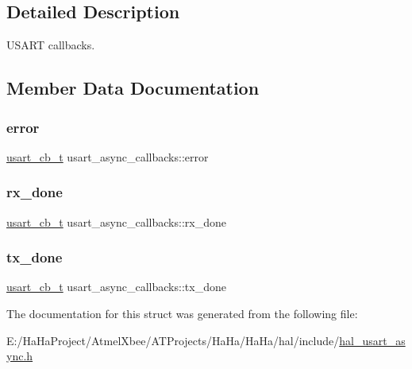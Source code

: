 \subsection{Detailed Description}
U\+S\+A\+RT callbacks. 

\subsection{Member Data Documentation}
\mbox{\label{structusart__async__callbacks_a04f0dca1ca10974d9458dd11871a5b58}} 
\subsubsection{\texorpdfstring{error}{error}}
{\footnotesize\ttfamily \hyperlink{group__doc__driver__hal__usart__async_ga430e4080a53e1f39c4d46da01200f633}{usart\+\_\+cb\+\_\+t} usart\+\_\+async\+\_\+callbacks\+::error}

\mbox{\label{structusart__async__callbacks_a5363ee6cc91c18b9cec22fcfc7270895}} 
\subsubsection{\texorpdfstring{rx\+\_\+done}{rx\_done}}
{\footnotesize\ttfamily \hyperlink{group__doc__driver__hal__usart__async_ga430e4080a53e1f39c4d46da01200f633}{usart\+\_\+cb\+\_\+t} usart\+\_\+async\+\_\+callbacks\+::rx\+\_\+done}

\mbox{\label{structusart__async__callbacks_a3b40d7b9783136ddf7e9bf49b9598d08}} 
\subsubsection{\texorpdfstring{tx\+\_\+done}{tx\_done}}
{\footnotesize\ttfamily \hyperlink{group__doc__driver__hal__usart__async_ga430e4080a53e1f39c4d46da01200f633}{usart\+\_\+cb\+\_\+t} usart\+\_\+async\+\_\+callbacks\+::tx\+\_\+done}



The documentation for this struct was generated from the following file\+:\begin{DoxyCompactItemize}
\item 
E\+:/\+Ha\+Ha\+Project/\+Atmel\+Xbee/\+A\+T\+Projects/\+Ha\+Ha/\+Ha\+Ha/hal/include/\hyperlink{hal__usart__async_8h}{hal\+\_\+usart\+\_\+async.\+h}\end{DoxyCompactItemize}
